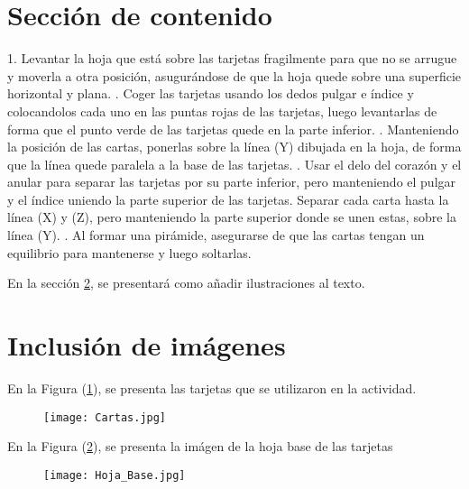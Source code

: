 \documentclass{article}
\begin{document}
\section{Sección de contenido} \label{contenido}
1. Levantar la hoja que está sobre las tarjetas fragilmente para que no se arrugue y moverla a otra posición, asugurándose de que la hoja quede sobre una superficie horizontal y plana.
. Coger las tarjetas usando los dedos pulgar e índice y colocandolos cada uno en las puntas rojas de las tarjetas, luego levantarlas de forma que el punto verde de las tarjetas quede en la parte inferior.
. Manteniendo la posición de las cartas, ponerlas sobre la línea (Y) dibujada en la hoja, de forma que la línea quede paralela a la base de las tarjetas.
. Usar el delo del corazón y el anular para separar las tarjetas por su parte inferior, pero manteniendo el pulgar y el índice uniendo la parte superior de las tarjetas. Separar cada carta hasta la línea (X) y (Z), pero manteniendo la parte superior donde se unen estas, sobre la línea (Y).
. Al formar una pirámide, asegurarse de que las cartas tengan un equilibrio para mantenerse y luego soltarlas.

En la sección \ref{imagenes}, se presentará como añadir ilustraciones al texto.

\section{Inclusión de imágenes} \label{imagenes}

En la Figura (\ref{fig:Cartas}), se presenta las tarjetas que se utilizaron en la actividad.

\begin{figure}[h]
\texttt{[image: Cartas.jpg]}
\centering
\label{fig:Cartas}
\end{figure}

En la Figura (\ref{fig:Hoja_Base}), se presenta la imágen de la hoja base de las tarjetas

\begin{figure}[h]
\texttt{[image: Hoja\_Base.jpg]}
\centering
\label{fig:Hoja_Base}
\end{figure}




\end{document}
